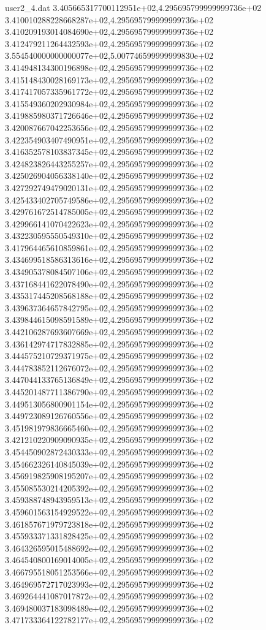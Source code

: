 \begin{filecontents}{user2_4.dat}
3.405665317700112951e+02,4.295695799999999736e+02
3.410010288228668287e+02,4.295695799999999736e+02
3.410209193014084690e+02,4.295695799999999736e+02
3.412479211264432593e+02,4.295695799999999736e+02
3.554540000000000077e+02,5.007746599999999830e+02
3.414948134300196898e+02,4.295695799999999736e+02
3.415148430028169173e+02,4.295695799999999736e+02
3.417417057335961772e+02,4.295695799999999736e+02
3.415549360202930984e+02,4.295695799999999736e+02
3.419885980371726646e+02,4.295695799999999736e+02
3.420087667042253656e+02,4.295695799999999736e+02
3.422354903407490951e+02,4.295695799999999736e+02
3.416352578103837345e+02,4.295695799999999736e+02
3.424823826443255257e+02,4.295695799999999736e+02
3.425026904056338140e+02,4.295695799999999736e+02
3.427292749479020131e+02,4.295695799999999736e+02
3.425433402705749586e+02,4.295695799999999736e+02
3.429761672514785005e+02,4.295695799999999736e+02
3.429966141070422623e+02,4.295695799999999736e+02
3.432230595550549310e+02,4.295695799999999736e+02
3.417964465610859861e+02,4.295695799999999736e+02
3.434699518586313616e+02,4.295695799999999736e+02
3.434905378084507106e+02,4.295695799999999736e+02
3.437168441622078490e+02,4.295695799999999736e+02
3.435317445208568188e+02,4.295695799999999736e+02
3.439637364657842795e+02,4.295695799999999736e+02
3.439844615098591589e+02,4.295695799999999736e+02
3.442106287693607669e+02,4.295695799999999736e+02
3.436142974717832885e+02,4.295695799999999736e+02
3.444575210729371975e+02,4.295695799999999736e+02
3.444783852112676072e+02,4.295695799999999736e+02
3.447044133765136849e+02,4.295695799999999736e+02
3.445201487711386790e+02,4.295695799999999736e+02
3.449513056800901154e+02,4.295695799999999736e+02
3.449723089126760556e+02,4.295695799999999736e+02
3.451981979836665460e+02,4.295695799999999736e+02
3.421210220909090935e+02,4.295695799999999736e+02
3.454450902872430333e+02,4.295695799999999736e+02
3.454662326140845039e+02,4.295695799999999736e+02
3.456919825908195207e+02,4.295695799999999736e+02
3.455085530214205392e+02,4.295695799999999736e+02
3.459388748943959513e+02,4.295695799999999736e+02
3.459601563154929522e+02,4.295695799999999736e+02
3.461857671979723818e+02,4.295695799999999736e+02
3.455933371331828425e+02,4.295695799999999736e+02
3.464326595015488692e+02,4.295695799999999736e+02
3.464540800169014005e+02,4.295695799999999736e+02
3.466795518051253566e+02,4.295695799999999736e+02
3.464969572717023993e+02,4.295695799999999736e+02
3.469264441087017872e+02,4.295695799999999736e+02
3.469480037183098489e+02,4.295695799999999736e+02
3.471733364122782177e+02,4.295695799999999736e+02

\end{filecontents}
